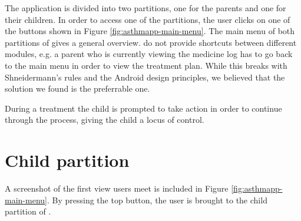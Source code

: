 The application is divided into two partitions, one for the parents and one for their children. In order to access one of the partitions, the user clicks on one of the buttons shown in Figure \ref{fig:asthmapp-main-menu}. The main menu of both partitions of \app{} gives a general overview. \app{} do not provide shortcuts between different modules, e.g. a parent who is currently viewing the medicine log has to go back to the main menu in order to view the treatment plan. While this breaks with Shneidermann's rules and the Android design principles, we believed that the solution we found is the preferrable one.  

During a treatment the child is prompted to take action in order to continue through the process, giving the child a locus of control. 



\section{Child partition}
\label{sec:description-child-partition}

A screenshot of the first view users meet is included in Figure \ref{fig:asthmapp-main-menu}. By pressing the top button, the user is brought to the child partition of \app{}. 

